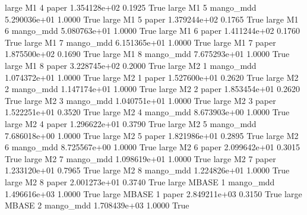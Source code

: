      large       M1                 4                 paper 1.354128e+02      0.1925    True
     large       M1                 5             mango_mdd 5.290036e+01      1.0000    True
     large       M1                 5                 paper 1.379244e+02      0.1765    True
     large       M1                 6             mango_mdd 5.080763e+01      1.0000    True
     large       M1                 6                 paper 1.411244e+02      0.1760    True
     large       M1                 7             mango_mdd 6.151365e+01      1.0000    True
     large       M1                 7                 paper 1.875500e+02      0.1690    True
     large       M1                 8             mango_mdd 7.675293e+01      1.0000    True
     large       M1                 8                 paper 3.228745e+02      0.2000    True
     large       M2                 1             mango_mdd 1.074372e+01      1.0000    True
     large       M2                 1                 paper 1.527600e+01      0.2620    True
     large       M2                 2             mango_mdd 1.147174e+01      1.0000    True
     large       M2                 2                 paper 1.853454e+01      0.2620    True
     large       M2                 3             mango_mdd 1.040751e+01      1.0000    True
     large       M2                 3                 paper 1.522251e+01      0.3520    True
     large       M2                 4             mango_mdd 8.673903e+00      1.0000    True
     large       M2                 4                 paper 1.296622e+01      0.3790    True
     large       M2                 5             mango_mdd 7.686018e+00      1.0000    True
     large       M2                 5                 paper 1.821986e+01      0.2895    True
     large       M2                 6             mango_mdd 8.725567e+00      1.0000    True
     large       M2                 6                 paper 2.099642e+01      0.3015    True
     large       M2                 7             mango_mdd 1.098619e+01      1.0000    True
     large       M2                 7                 paper 1.233120e+01      0.7965    True
     large       M2                 8             mango_mdd 1.224826e+01      1.0000    True
     large       M2                 8                 paper 2.001273e+01      0.3740    True
     large    MBASE                 1             mango_mdd 1.496616e+03      1.0000    True
     large    MBASE                 1                 paper 2.849211e+03      0.3150    True
     large    MBASE                 2             mango_mdd 1.708439e+03      1.0000    True
